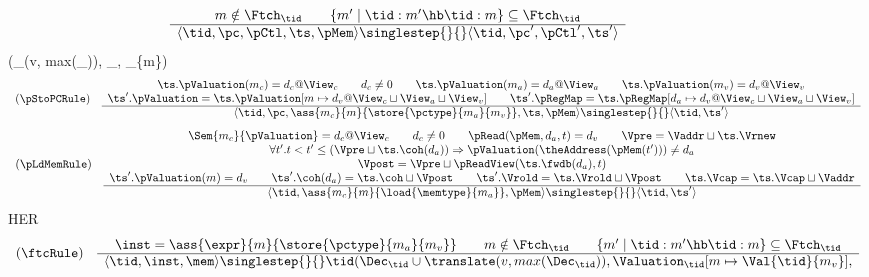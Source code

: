 \begin{figure}
\[\begin{array}{cc}
\begin{array}{c}
m\notin\Ftch_\tid \qquad
\{m'\mid \tid:m'\hb \tid:m\}\subseteq \Ftch_\tid
\\ \hline
\langle \tid,\pc,\pCtl,\ts,\pMem\rangle
\singlestep{}{}
\langle \tid,\pc',\pCtl',\ts'\rangle
\end{array}
\end{array}
\]
%
\tid(\Dec_\tid\cup \translate(v, max(\Dec_\tid)),
     \Valuation_,
     \Ftch_\tid\cup\{m\})
%
\[
\begin{array}{cc}
(\pStoPCRule)
&
\begin{array}{c}
\ts.\pValuation(m_c) = d_c@\View_c \qquad d_c \neq 0 \qquad
\ts.\pValuation(m_a) = d_a@\View_a \qquad \ts.\pValuation(m_v)  = d_v@\View_v \\
\ts'.\pValuation = \ts.\pValuation[m\mapsto d_v @ \View_c\sqcup\View_a\sqcup\View_v] \qquad
\ts'.\pRegMap = \ts.\pRegMap[d_a \mapsto d_v @ \View_c\sqcup\View_a\sqcup\View_v]
\\ \hline
\langle \tid,\pc,\ass{m_c}{m}{\store{\pctype}{m_a}{m_v}},\ts,\pMem\rangle
\singlestep{}{}
\langle\tid,\ts'\rangle
\end{array}
\end{array}
\]
%
\[
\begin{array}{cc}
(\pLdMemRule)
&
\begin{array}{c}
\Sem{m_c}{\pValuation} = d_c@\View_{c} \qquad d_c \neq 0 \qquad
\pRead(\pMem,d_a,t)=d_v \qquad \Vpre = \Vaddr \sqcup \ts.\Vrnew \\
\forall t'.t<t'\leq(\Vpre\sqcup\ts.\coh(d_a))\Rightarrow\pValuation(\theAddress(\pMem(t')))\neq d_a \\
\Vpost = \Vpre\sqcup\pReadView(\ts.\fwdb(d_a),t) \\
\ts'.\pValuation(m) = d_v \qquad \ts'.\coh(d_a) = \ts.\coh\sqcup\Vpost \qquad
\ts'.\Vrold = \ts.\Vrold\sqcup \Vpost \qquad \ts.\Vcap = \ts.\Vcap\sqcup\Vaddr
\\ \hline
\langle \tid,\ass{m_c}{m}{\load{\memtype}{m_a}},\pMem\rangle
\singlestep{}{}
\langle\tid,\ts'\rangle
\end{array}
\end{array}
\]
HER
\[
\begin{array}{cc}
(\ftcRule)
&
\begin{array}{c}
\inst= \ass{\expr}{m}{\store{\pctype}{m_a}{m_v}} \qquad
m\notin\Ftch_\tid \qquad
\{m'\mid \tid:m'\hb \tid:m\}\subseteq \Ftch_\tid
\\ \hline
\langle \tid,\inst,\mem\rangle
\singlestep{}{}
\tid(\Dec_\tid\cup \translate(v, max(\Dec_\tid)),
     \Valuation_\tid[m\mapsto\Val{\tid}{m_v}],

\end{array}
\end{array}\]
\end{figure}
